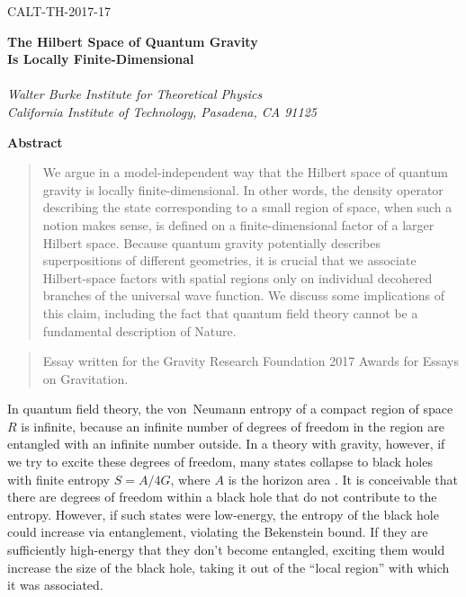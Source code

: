 \documentclass[12pt,english]{article}
\begin{document}
\baselineskip=14pt
\hfill CALT-TH-2017-17
\hfill

\vspace{2cm}
\thispagestyle{empty}
\begin{center}
{\LARGE\bf
The Hilbert Space of Quantum Gravity\\
Is Locally Finite-Dimensional
}\\
\bigskip{} \\[7mm]
 {\it Walter Burke Institute for Theoretical Physics\\
    California Institute of Technology,
   Pasadena, CA 91125} \\
 \end{center}
\bigskip
\centerline{\large\bf Abstract}

\begin{quote} \small
We argue in a model-independent way that the Hilbert space of quantum gravity is locally finite-dimensional.
In other words, the density operator describing the state corresponding to a small region of space, when such a notion makes sense, is defined on a finite-dimensional factor of a larger Hilbert space.
Because quantum gravity potentially describes superpositions of different geometries, it is crucial that we associate Hilbert-space factors with spatial regions only on individual decohered branches of the universal wave function.
We discuss some implications of this claim, including the fact that quantum field theory cannot be a fundamental description of Nature.
\end{quote}


\vspace{3cm}


\begin{quote} \footnotesize
Essay written for the Gravity Research Foundation 2017 Awards for Essays on Gravitation.
\end{quote}



\newpage
\baselineskip=16pt
	
\setcounter{footnote}{0}

In quantum field theory, the von~Neumann entropy of a compact region of space $R$ is infinite, because an infinite number of degrees of freedom in the region are entangled with an infinite number outside.
In a theory with gravity, however, if we try to excite these degrees of freedom, many states collapse to black holes with finite entropy $S=A/4G$, where $A$ is the horizon area \cite{bekenstein1973, bekenstein1981}.
It is conceivable that there are degrees of freedom within a black hole that do not contribute to the entropy.
However, if such states were low-energy, the entropy of the black hole could increase via entanglement, violating the Bekenstein bound.
If they are sufficiently high-energy that they don't become entangled, exciting them would increase the size of the black hole, taking it out of the ``local region'' with which it was associated.
\end{document}
